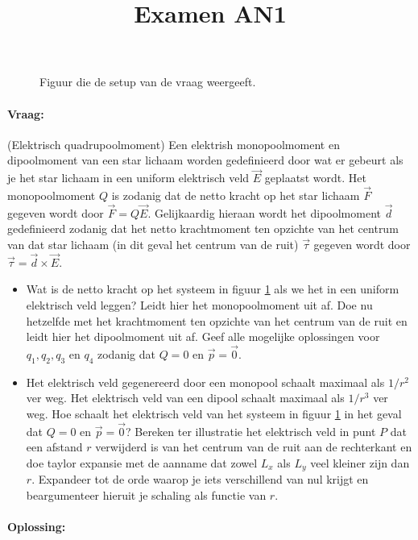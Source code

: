 \documentclass[11pt]{article}
\title{Examen AN1}
\begin{document}
\begin{figure}
\centering
{}
\caption{Figuur die de setup van de vraag weergeeft.}
\label{fig:ElektrischeQuadrupool}
\end{figure}
\paragraph{Vraag:}(Elektrisch quadrupoolmoment) Een elektrish monopoolmoment en dipoolmoment van een star lichaam worden gedefinieerd door wat er gebeurt als je het star lichaam in een uniform elektrisch veld $\vec{E}$ geplaatst wordt. Het monopoolmoment $Q$ is zodanig dat de netto kracht op het star lichaam $\vec{F}$ gegeven wordt door $\vec{F}=Q\vec{E}$. Gelijkaardig hieraan wordt het dipoolmoment $\vec{d}$ gedefinieerd zodanig dat het netto krachtmoment ten opzichte van het centrum van dat star lichaam (in dit geval het centrum van de ruit) $\vec{\tau}$ gegeven wordt door $\vec\tau=\vec{d}\times\vec{E}$.
\begin{itemize}
	\item Wat is de netto kracht op het systeem in figuur \ref{fig:ElektrischeQuadrupool} als we het in een uniform elektrisch veld leggen? Leidt hier het monopoolmoment uit af. Doe nu hetzelfde met het krachtmoment ten opzichte van het centrum van de ruit en leidt hier het dipoolmoment uit af. Geef alle mogelijke oplossingen voor $q_1,q_2,q_3$ en $q_4$ zodanig dat $Q=0$ en $\vec{p}=\vec{0}$.
	\item Het elektrisch veld gegenereerd door een monopool schaalt maximaal als $1/r^2$ ver weg. Het elektrisch veld van een dipool schaalt maximaal als $1/r^3$ ver weg. Hoe schaalt het elektrisch veld van het systeem in figuur \ref{fig:ElektrischeQuadrupool} in het geval dat $Q=0$ en $\vec{p}=\vec{0}$? Bereken ter illustratie het elektrisch veld in punt $P$ dat een afstand $r$ verwijderd is van het centrum van de ruit aan de rechterkant en doe taylor expansie met de aanname dat zowel $L_x$ als $L_y$ veel kleiner zijn dan $r$. Expandeer tot de orde waarop je iets verschillend van nul krijgt en beargumenteer hieruit je schaling als functie van $r$.
\end{itemize}
\paragraph{Oplossing:}
\end{document}
